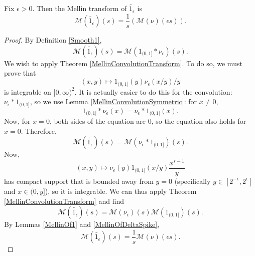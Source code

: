 \begin{lemma}[MellinOfSmooth1a]
\label{MellinOfSmooth1a}
\leanok
Fix  $\epsilon>0$. Then the Mellin transform of $\widetilde{1_{\epsilon}}$ is
  $$\mathcal{M}(\widetilde{1_{\epsilon}})(s) =
  \frac{1}{s}\left(\mathcal{M}(\nu)\left(\epsilon s\right)\right).$$
\end{lemma}
\begin{proof}
\leanok
By Definition \ref{Smooth1},
  $$
    \mathcal M(\widetilde{1_\epsilon})(s)
    =\mathcal M(1_{(0,1]}\ast\nu_\epsilon)(s)
    .
  $$
  We wish to apply Theorem \ref{MellinConvolutionTransform}.
  To do so, we must prove that
  $$
    (x,y)\mapsto 1_{(0,1]}(y)\nu_\epsilon(x/y)/y
  $$
  is integrable on $[0,\infty)^2$.
  It is actually easier to do this for the convolution: $\nu_\epsilon\ast 1_{(0,1]}$, so we use
  Lemma \ref{MellinConvolutionSymmetric}: for $x\neq0$,
  $$
    1_{(0,1]}\ast\nu_\epsilon(x)=\nu_\epsilon\ast 1_{(0,1]}(x)
    .
  $$
  Now, for $x=0$, both sides of the equation are 0, so the equation also holds for $x=0$.
  Therefore,
  $$
    \mathcal M(\widetilde{1_\epsilon})(s)
    =\mathcal M(\nu_\epsilon\ast 1_{(0,1]})(s)
    .
  $$
  Now,
  $$
    (x,y)\mapsto \nu_\epsilon(y)1_{(0,1]}(x/y)\frac{x^{s-1}}y
  $$
  has compact support that is bounded away from $y=0$ (specifically
  $y\in[2^{-\epsilon},2^\epsilon]$ and $x\in(0,y]$), so it is integrable.
  We can thus apply Theorem \ref{MellinConvolutionTransform} and find
  $$
    \mathcal M(\widetilde{1_\epsilon})(s)
    =\mathcal M(\nu_\epsilon)(s)\mathcal M(1_{(0,1]})(s)
    .
  $$
  By Lemmas \ref{MellinOf1} and \ref{MellinOfDeltaSpike},
  $$
    \mathcal M(\widetilde{1_\epsilon})(s)
    =\frac1s\mathcal M(\nu)(\epsilon s)
    .
  $$
\end{proof}
